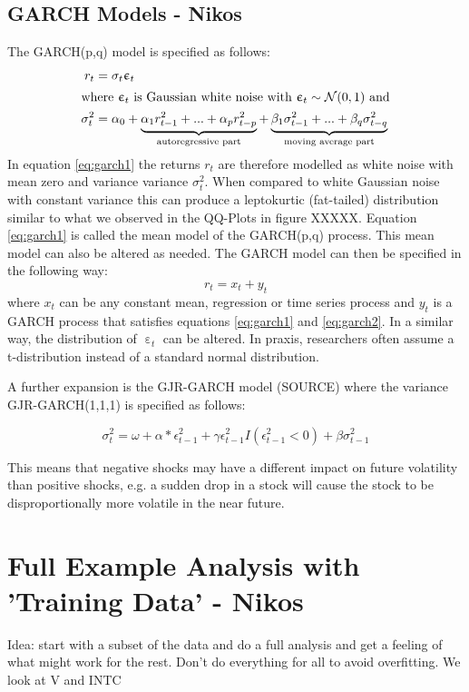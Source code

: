 \subsection{GARCH Models - Nikos}
The GARCH(p,q) model is specified as follows:
\begin{align}
    r_{t} &= \sigma_t  \upepsilon_t \label{eq:garch1}\\
\intertext{where $\upepsilon_t$ is Gaussian white noise with  $\upepsilon_t \sim \mathcal{N}(0,1)$ and}
    \sigma^2_t &= \alpha_0 + \underbrace{\alpha_1 r^2_{t-1} + ... + \alpha_p r^2_{t-p}}_\text{autoregressive part} + \underbrace{\beta_1 \sigma^2_{t-1} + ... + \beta_q \sigma^2_{t-q}}_\text{moving average part} \label{eq:garch2}
\end{align}{}
In equation \ref{eq:garch1} the returns $r_t$ are therefore modelled as white noise with mean zero and variance variance $\sigma^2_t$. When compared to white Gaussian noise with constant variance this can produce a leptokurtic (fat-tailed) distribution similar to what we observed in the QQ-Plots in figure XXXXX. Equation \ref{eq:garch1} is called the mean model of the GARCH(p,q) process. This mean model can also be altered as needed. The GARCH model can then be specified in the following way: 
\begin{equation}
    r_t = x_t + y_t
\end{equation}{}
where $x_t$ can be any constant mean, regression or time series process and $y_t$ is a GARCH process that satisfies equations \ref{eq:garch1} and \ref{eq:garch2}. In a similar way, the distribution of $\upepsilon_t$ can be altered. In praxis, researchers often assume a t-distribution instead of a standard normal distribution. 

A further expansion is the GJR-GARCH model (SOURCE) where the variance GJR-GARCH(1,1,1) is specified as follows: 

\begin{equation}
    \sigma^2_t = \omega + \alpha * \epsilon^2_{t-1} + \gamma \epsilon^2_{t-1} I(\epsilon^2_{t-1} < 0) + \beta \sigma^2_{t-1} 
\end{equation}{}

This means that negative shocks may have a different impact on future volatility than positive shocks, e.g. a sudden drop in a stock will cause the stock to be disproportionally more volatile in the near future. 

\section{Full Example Analysis with 'Training Data'  - Nikos}
Idea: start with a subset of the data and do a full analysis and get a feeling of what might work for the rest. Don't do everything for all to avoid overfitting. We look at V and INTC


